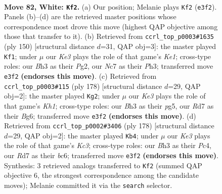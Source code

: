 \documentclass[11pt]{article}
\begin{document}
\clearpage

\begin{figure}[p]\centering
\begin{subfigure}{0.46\textwidth}\centering
\resizebox{\linewidth}{!}{%
\newchessgame
\chessboard[
  setfen={8/PbNR4/7k/5P2/np6/4K1PB/7P/8 w - - 1 82},
  showmover=false,
  pgfstyle=straightmove, color=movearrow, markmove={e3-f2}
]}
\caption{}
\end{subfigure}\hfill
\begin{subfigure}{0.46\textwidth}\centering
\resizebox{\linewidth}{!}{%
\newchessgame
\chessboard[
  setfen={8/b7/8/1P6/5pBp/3k3P/6P1/4K3 w - - 26 76},
  showmover=false,
  pgfstyle=straightmove, color=movearrow, markmove={e1-f1}
]}
\caption{}
\end{subfigure}
\\[4pt]
\begin{subfigure}{0.46\textwidth}\centering
\resizebox{\linewidth}{!}{%
\newchessgame
\chessboard[
  setfen={8/2b5/6Bp/6p1/3k2P1/7P/2P2P2/7K w - - 95 90},
  showmover=false,
  pgfstyle=straightmove, color=movearrow, markmove={h1-g2}
]}
\caption{}
\end{subfigure}\hfill
\begin{subfigure}{0.46\textwidth}\centering
\resizebox{\linewidth}{!}{%
\newchessgame
\chessboard[
  setfen={8/8/2b1k1p1/2P5/p1P4P/2K3P1/8/2B5 w - - 5 90},
  showmover=false,
  pgfstyle=straightmove, color=movearrow, markmove={c3-b4}
]}
\caption{}
\end{subfigure}
\caption{\textbf{Move 82, White: \texttt{Kf2}.} (a) Our position; Melanie plays \texttt{Kf2} (\texttt{e3f2}). Panels (b)--(d) are the retrieved master positions whose correspondence most drove this move (highest QAP objective among those that transfer to it). (b) Retrieved from \texttt{ccrl\_top\_p0003\#1635} (ply 150) [structural distance $d$=31, QAP obj=3]: the master played \texttt{Kf1}; under $\mu$ our \emph{Ke3} plays the role of that game's \emph{Ke1}; cross-type roles: our \emph{B}h3 as their \emph{P}g2, our \emph{N}c7 as their \emph{P}h3; transferred move \texttt{e3f2} \textbf{(endorses this move)}. (c) Retrieved from \texttt{ccrl\_top\_p0003\#115} (ply 178) [structural distance $d$=29, QAP obj=2]: the master played \texttt{Kg2}; under $\mu$ our \emph{Ke3} plays the role of that game's \emph{Kh1}; cross-type roles: our \emph{B}h3 as their \emph{p}g5, our \emph{R}d7 as their \emph{B}g6; transferred move \texttt{e3f2} \textbf{(endorses this move)}. (d) Retrieved from \texttt{ccrl\_top\_p0002\#3406} (ply 178) [structural distance $d$=29, QAP obj=2]: the master played \texttt{Kb4}; under $\mu$ our \emph{Ke3} plays the role of that game's \emph{Kc3}; cross-type roles: our \emph{B}h3 as their \emph{P}c4, our \emph{R}d7 as their \emph{b}c6; transferred move \texttt{e3f2} \textbf{(endorses this move)}. Synthesis: 3 retrieved analogs transferred to \texttt{Kf2} (summed QAP objective 6, the strongest correspondence among the candidate moves); Melanie committed it via the \texttt{search} selector.}
\label{fig:thought-m162}
\end{figure}
\end{document}
